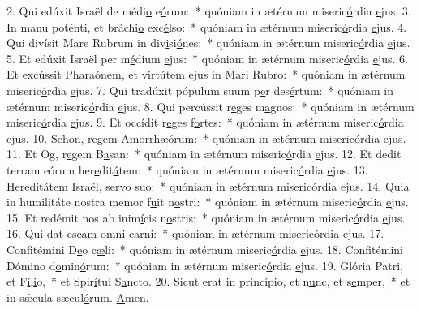 2. Qui edúxit Israël de médi\uline{o} e\uline{ó}rum:~* quóniam in ætérnum miseric\uline{ó}rdia \uline{e}jus.
3. In manu poténti, et bráchi\uline{o} exc\uline{é}lso:~* quóniam in ætérnum miseric\uline{ó}rdia \uline{e}jus.
4. Qui divísit Mare Rubrum in div\uline{i}si\uline{ó}nes:~* quóniam in ætérnum miseric\uline{ó}rdia \uline{e}jus.
5. Et edúxit Israël per m\uline{é}dium \uline{e}jus:~* quóniam in ætérnum miseric\uline{ó}rdia \uline{e}jus.
6. Et excússit Pharaónem, et virtútem ejus in M\uline{a}ri R\uline{u}bro:~* quóniam in ætérnum miseric\uline{ó}rdia \uline{e}jus.
7. Qui tradúxit pópulum suum p\uline{e}r des\uline{é}rtum:~* quóniam in ætérnum miseric\uline{ó}rdia \uline{e}jus.
8. Qui percússit r\uline{e}ges m\uline{a}gnos:~* quóniam in ætérnum miseric\uline{ó}rdia \uline{e}jus.
9. Et occídit r\uline{e}ges f\uline{o}rtes:~* quóniam in ætérnum miseric\uline{ó}rdia \uline{e}jus.
10. Sehon, regem Am\uline{o}rrhæ\uline{ó}rum:~* quóniam in ætérnum miseric\uline{ó}rdia \uline{e}jus.
11. Et Og, r\uline{e}gem B\uline{a}san:~* quóniam in ætérnum miseric\uline{ó}rdia \uline{e}jus.
12. Et dedit terram eórum her\uline{e}dit\uline{á}tem:~* quóniam in ætérnum miseric\uline{ó}rdia \uline{e}jus.
13. Hereditátem Israël, s\uline{e}rvo s\uline{u}o:~* quóniam in ætérnum miseric\uline{ó}rdia \uline{e}jus.
14. Quia in humilitáte nostra memor f\uline{u}it n\uline{o}stri:~* quóniam in ætérnum miseric\uline{ó}rdia \uline{e}jus.
15. Et redémit nos ab inim\uline{í}cis n\uline{o}stris:~* quóniam in ætérnum miseric\uline{ó}rdia \uline{e}jus.
16. Qui dat escam \uline{o}mni c\uline{a}rni:~* quóniam in ætérnum miseric\uline{ó}rdia \uline{e}jus.
17. Confitémini D\uline{e}o c\uline{æ}li:~* quóniam in ætérnum miseric\uline{ó}rdia \uline{e}jus.
18. Confitémini Dómino d\uline{o}min\uline{ó}rum:~* quóniam in ætérnum miseric\uline{ó}rdia \uline{e}jus.
19. Glória Patri, et F\uline{í}l\uline{i}o,~* et Spir\uline{í}tui S\uline{a}ncto.
20. Sicut erat in princípio, et n\uline{u}nc, et s\uline{e}mper,~* et in sǽcula sæcul\uline{ó}rum. \uline{A}men.
